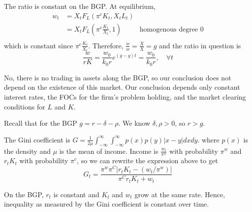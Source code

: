 The ratio is constant on the BGP.
At equilibrium, 
\begin{align} 
    w_t&=X_t F_L\left(\pi^c K_t, X_t L_t\right) \\
       &=X_t F_L\left(\pi^c \frac{K_t}{X_t}, 1\right) & \text{homogenous degree }0 \\
\end{align}
which is constant since $\pi^c \frac{K_t}{X_t}$. 
Therefore, $\frac{\dot{w}}{w}=\frac{\dot{X}}{X}=g$ and the ratio in question is
$$
\frac{w}{r K}=\frac{w_0}{k_0 r} e^{(g-g) t}=\frac{w_0}{k_0 r}, \quad \forall t
$$

No, there is no trading in assets along the BGP, so our conclusion does not depend on the existence of this market.
Our conclusion depends only constant interest rates, the FOCs for the firm's problem holding, and the market clearing conditions for $L$ and $K$.

Recall that for the BGP $g=r-\delta-\rho$. We know $\delta,\rho > 0$, so $r > g$.

The Gini coefficient is 
$
G=\frac{1}{2 \mu} \int_{-\infty}^{\infty} \int_{-\infty}^{\infty} p(x) p(y)|x-y| d x d y
$.
where $p(x)$ is the density and $\mu$ is the mean of income.
Income is $\frac{w_t}{\pi^w}$ with probability $\pi^w$ and $r_t K_t$ with probability $\pi^c$, so we can rewrite the expression above to get
$$
G_t=\frac{\pi^w \pi^C\left|r_t K_t-\left(w_t / \pi^w\right)\right|}{\pi^C r_t K_t+w_t}
$$

On the BGP, $r_t$ is constant and $K_t$ and $w_t$ grow at the same rate.
Hence, inequality as measured by the Gini coefficient is constant over time.
